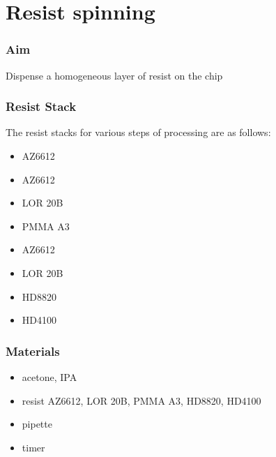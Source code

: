 \section{Resist spinning}
\label{sec:resistspinning}

\subsubsection{Aim}
Dispense a homogeneous layer of resist on the chip

\subsubsection{Resist Stack}
The resist stacks for various steps of processing are as follows:
\begin{description}[noitemsep, nolistsep, leftmargin=\parindent, labelindent=\parindent]
\item[Mesa Etch] \hfill
  \begin{itemize} [noitemsep, nolistsep]
    \item AZ6612
  \end{itemize}
\item[Ohmics] \hfill
  \begin{itemize} [noitemsep, nolistsep]
    \item AZ6612
    \item LOR 20B
  \end{itemize}
\item[Fine Gates] \hfill
  \begin{itemize} [noitemsep, nolistsep]
    \item PMMA A3
  \end{itemize}
\item[Optical Metals] \hfill
  \begin{itemize} [noitemsep, nolistsep]
    \item AZ6612
    \item LOR 20B
  \end{itemize}
\item[Polyimide Dielectrics] \hfill
  \begin{itemize} [noitemsep, nolistsep]
    \item HD8820
    \item HD4100
  \end{itemize}
\end{description}

\subsubsection{Materials}
\begin{itemize} [noitemsep]
\item acetone, IPA
\item resist AZ6612, LOR 20B, PMMA A3, HD8820, HD4100
\item pipette
\item timer
\end{itemize}

